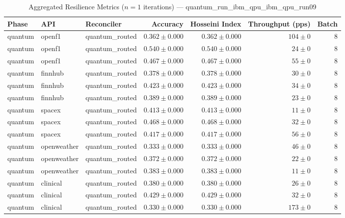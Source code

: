 
\begin{table}[htbp]
\caption{Aggregated Resilience Metrics ($n=1$ iterations) --- quantum_run_ibm_qpu_ibm_qpu_run09}
\begin{tabular}{l l l r r r r}
\hline
Phase & API & Reconciler & Accuracy & Hosseini Index & Throughput (pps) & Batch \\
\hline
quantum & openf1 & quantum\_routed & $0.362\pm0.000$ & $0.362\pm0.000$ & $104\pm0$ & 8 \\
quantum & openf1 & quantum\_routed & $0.540\pm0.000$ & $0.540\pm0.000$ & $24\pm0$ & 8 \\
quantum & openf1 & quantum\_routed & $0.467\pm0.000$ & $0.467\pm0.000$ & $55\pm0$ & 8 \\
quantum & finnhub & quantum\_routed & $0.378\pm0.000$ & $0.378\pm0.000$ & $30\pm0$ & 8 \\
quantum & finnhub & quantum\_routed & $0.423\pm0.000$ & $0.423\pm0.000$ & $34\pm0$ & 8 \\
quantum & finnhub & quantum\_routed & $0.389\pm0.000$ & $0.389\pm0.000$ & $23\pm0$ & 8 \\
quantum & spacex & quantum\_routed & $0.413\pm0.000$ & $0.413\pm0.000$ & $11\pm0$ & 8 \\
quantum & spacex & quantum\_routed & $0.468\pm0.000$ & $0.468\pm0.000$ & $32\pm0$ & 8 \\
quantum & spacex & quantum\_routed & $0.417\pm0.000$ & $0.417\pm0.000$ & $56\pm0$ & 8 \\
quantum & openweather & quantum\_routed & $0.333\pm0.000$ & $0.333\pm0.000$ & $46\pm0$ & 8 \\
quantum & openweather & quantum\_routed & $0.372\pm0.000$ & $0.372\pm0.000$ & $22\pm0$ & 8 \\
quantum & openweather & quantum\_routed & $0.383\pm0.000$ & $0.383\pm0.000$ & $11\pm0$ & 8 \\
quantum & clinical & quantum\_routed & $0.380\pm0.000$ & $0.380\pm0.000$ & $26\pm0$ & 8 \\
quantum & clinical & quantum\_routed & $0.429\pm0.000$ & $0.429\pm0.000$ & $32\pm0$ & 8 \\
quantum & clinical & quantum\_routed & $0.330\pm0.000$ & $0.330\pm0.000$ & $173\pm0$ & 8 \\

\end{tabular}
\end{table}

